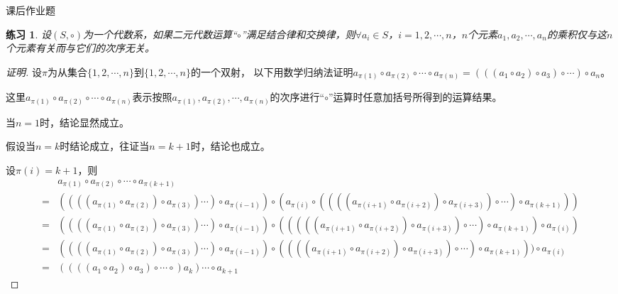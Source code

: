 \documentclass{article}
\newtheorem{Exercise}{练习}
\begin{document}
\begin{CJK*}{UTF8}{gbsn}

  课后作业题

  \begin{Exercise}
    设$(S,\circ)$为一个代数系，如果二元代数运算“$\circ$”满足结合律和交换律，则$\forall a_i\in S$，$i=1,2,\cdots,n$，$n$个元素$a_1,a_2,\cdots,a_n$的乘积仅与这$n$个元素有关而与它们的次序无关。
  \end{Exercise}

\begin{proof}[证明]
    设$\pi$为从集合$\{1,2,\cdots,n\}$到$\{1,2,\cdots,n\}$的一个双射，
    以下用数学归纳法证明$a_{\pi(1)}\circ a_{\pi(2)}\circ \cdots \circ a_{\pi(n)}=(((a_1\circ a_2)\circ a_3)\circ \cdots )\circ a_n$。

    这里$a_{\pi(1)}\circ a_{\pi(2)}\circ \cdots \circ a_{\pi(n)}$表示按照$a_{\pi(1)},a_{\pi(2)}, \cdots, a_{\pi(n)}$的次序进行“$\circ$”运算时任意加括号所得到的运算结果。

    当$n=1$时，结论显然成立。

    假设当$n=k$时结论成立，往证当$n=k+1$时，结论也成立。

    设$\pi(i)=k+1$，则
    \begin{align*}
        &a_{\pi(1)}\circ a_{\pi(2)}\circ \cdots \circ a_{\pi(k+1)}\\
        =&((((a_{\pi(1)}\circ a_{\pi(2)})\circ a_{\pi(3)}) \cdots )\circ a_{\pi(i-1)})\circ (a_{\pi(i)} \circ ((((a_{\pi(i+1)}\circ a_{\pi(i+2)})\circ a_{\pi(i+3)})\circ \cdots )\circ a_{\pi(k+1)}))\\
        =&((((a_{\pi(1)}\circ a_{\pi(2)})\circ a_{\pi(3)}) \cdots )\circ a_{\pi(i-1)})\circ (((((a_{\pi(i+1)}\circ a_{\pi(i+2)})\circ a_{\pi(i+3)})\circ \cdots )\circ a_{\pi(k+1)})\circ a_{\pi(i)} )\\
        =&((((a_{\pi(1)}\circ a_{\pi(2)})\circ a_{\pi(3)}) \cdots )\circ a_{\pi(i-1)})\circ ((((a_{\pi(i+1)}\circ a_{\pi(i+2)})\circ a_{\pi(i+3)})\circ \cdots )\circ a_{\pi(k+1)}))\circ a_{\pi(i)}\\
        =&((((a_1\circ a_2)\circ a_3)\circ \cdots \circ) a_{k})\cdots \circ a_{k+1}
    \end{align*}
\end{proof}
\end{CJK*}
\end{document}
